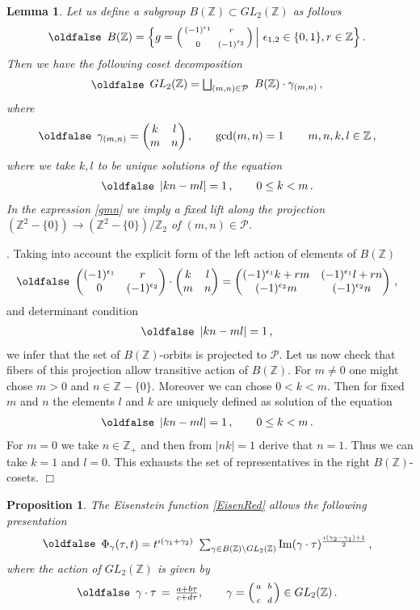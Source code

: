 \documentclass[12pt]{article}
\def\IZ{\mathbb{Z}}
\def\CP {\mathcal{P}}
\def\g {{\gamma}}
\def\c{\cdot}
\newtheorem{prop}{Proposition}[section]           %
\newtheorem{lem}{Lemma}[section]
\newcommand{\proof}{\noindent {\it Proof}. }
\def\be{\begin{eqnarray}\new\begin{array}{cc}}
\def\ee{\end{array}\end{eqnarray}}
\def\i{\imath}
\begin{document}
\begin{lem} Let us define a subgroup $B(\IZ)\subset GL_2(\IZ)$ as
  follows
 \be
  B(\IZ)=\Big\{g=\Big(\begin{smallmatrix}
  (-1)^{\epsilon_1} && r \\&&\\
  0 && (-1)^{\epsilon_2}\end{smallmatrix}\Big)\,\Big|\,\,
  \epsilon_{1,2}\in\{0,1\}, r\in
  \IZ\Big\}\,.
 \ee
Then we have the following coset decomposition
 \be
  GL_2(\IZ)=\bigsqcup_{(m,n)\in \CP}\,\,B(\IZ)\cdot \g_{(m,n)}\,,
 \ee
where
 \be\label{gmn}
  \g_{(m,n)}=\begin{pmatrix} k & l \\m & n\end{pmatrix}, \qquad
  {\rm gcd}(m,n)=1\,\qquad m,n,k,l \in \IZ \,,
 \ee
where we take $k,l$ to be unique solutions of the equation
 \be
  |kn-ml|=1\,, \qquad 0\leq k<m\,.
 \ee
In the expression \eqref{gmn} we imply a fixed lift along  the projection
$(\IZ^2-\{0\})\to (\IZ^2-\{0\})/\IZ_2$  of $(m,n)\in \CP$.
 \end{lem}

 \proof Taking into account the explicit form of the left action of
 elements of $B(\IZ)$
\be
\begin{pmatrix} (-1)^{\epsilon_1} & r \\ 0
  & (-1)^{\epsilon_2}\end{pmatrix}\cdot
\begin{pmatrix} k & l \\ m & n \end{pmatrix}
=\begin{pmatrix} (-1)^{\epsilon_1}k+rm  & (-1)^{\epsilon_1}l+rn \\
 (-1)^{\epsilon_2}m & (-1)^{\epsilon_2} n \end{pmatrix}\,,
\ee
and determinant condition
\be
|kn-ml|=1\,,
\ee
we infer that the set of $B(\IZ)$-orbits is projected to $\CP$. Let us
now check that  fibers of this projection allow transitive action of
$B(\IZ)$. For  $m\neq 0$ one might  chose $m>0$ and $n\in \IZ-\{0\}$.
Moreover we can chose $0<k<m$. Then for fixed $m$ and $n$ the
elements $l$ and $k$ are uniquely defined as
solution of the equation
\be
|kn-ml|=1\,, \qquad 0\leq k<m\,.
\ee
For $m=0$ we take $n\in \IZ_+$ and then from $|nk|=1$ derive that
$n=1$. Thus we can take
$k=1$ and $l=0$. This exhausts the set of representatives in the right
$B(\IZ)$-cosets.  $\Box$


\begin{prop} The Eisenstein function \eqref{EisenRed} allows the
  following presentation
 \be \label{EisenInv}
  \Phi_\gamma(\tau,t)=t^{\imath(\gamma_1+\gamma_2)}\,\,
  \sum_{\gamma\in B(\IZ)\backslash GL_2(\IZ)}
  {\rm Im}(\gamma\cdot\tau)^{\frac{\i(\g_2-\g_1)+1}{2}}\,,
 \ee
where  the action of $GL_2(\IZ)$ is given by
 \be
  \gamma\cdot\tau\,
  =\,\frac{a+b\tau}{c+d\tau},\qquad
  \gamma=\Big(\begin{smallmatrix}
  a&&b\\&&\\c&&d
  \end{smallmatrix}\Big)\in GL_2(\IZ)\,.
 \ee
\end{prop}
\end{document}

